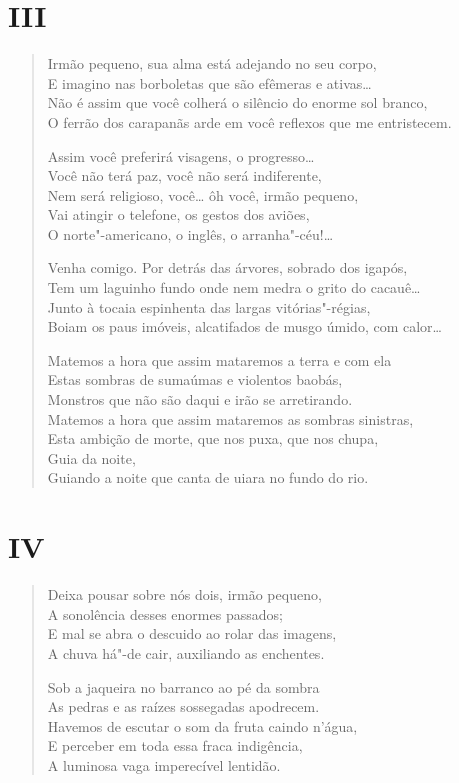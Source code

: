 \medskip
\section*{III}

\begin{verse}
Irmão pequeno, sua alma está adejando no seu corpo,\\
E imagino nas borboletas que são efêmeras e ativas\ldots{}\\
Não é assim que você colherá o silêncio do enorme sol branco,\\
O ferrão dos carapanãs arde em você reflexos que me entristecem.

Assim você preferirá visagens, o progresso\ldots{}\\
Você não terá paz, você não será indiferente,\\
Nem será religioso, você\ldots{} ôh você, irmão pequeno,\\
Vai atingir o telefone, os gestos dos aviões,\\
O norte"-americano, o inglês, o arranha"-céu!\ldots{}

Venha comigo. Por detrás das árvores, sobrado dos igapós,\\
Tem um laguinho fundo onde nem medra o grito do cacauê\ldots{}\\
Junto à tocaia espinhenta das largas vitórias"-régias,\\
Boiam os paus imóveis, alcatifados de musgo úmido, com calor\ldots{}

Matemos a hora que assim mataremos a terra e com ela\\
Estas sombras de sumaúmas e violentos baobás,\\
Monstros que não são daqui e irão se arretirando.\\
Matemos a hora que assim mataremos as sombras sinistras,\\
Esta ambição de morte, que nos puxa, que nos chupa,\\
Guia da noite,\\
Guiando a noite que canta de uiara no fundo do rio.
\end{verse}

\medskip
\section*{IV}

\begin{verse}
Deixa pousar sobre nós dois, irmão pequeno,\\
A sonolência desses enormes passados;\\
E mal se abra o descuido ao rolar das imagens,\\
A chuva há"-de cair, auxiliando as enchentes.

Sob a jaqueira no barranco ao pé da sombra\\
As pedras e as raízes sossegadas apodrecem.\\
Havemos de escutar o som da fruta caindo n'água,\\
E perceber em toda essa fraca indigência,\\
A luminosa vaga imperecível lentidão.
\end{verse}

